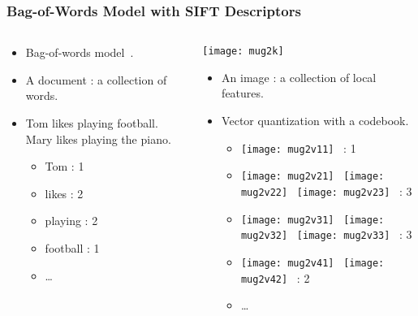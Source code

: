 \documentclass{beamer}
\begin{document}
\begin{frame}
  \frametitle{Bag-of-Words Model with SIFT Descriptors}

  \begin{columns}
    \begin{column}{.46\textwidth}
      \begin{itemize}
        \item Bag-of-words model~\cite{csurka_visual_2004}. 
      \end{itemize}

      \begin{itemize}
        \item A document : a collection of words.
        \item Tom likes playing football. Mary likes playing the piano.
          \begin{itemize}
            \item Tom : 1
            \item likes : 2
            \item playing : 2
            \item football : 1
            \item \ldots
          \end{itemize}
      \end{itemize}
    \end{column}
    \begin{column}{.46\textwidth}
      \centering
      \texttt{[image: mug2k]}
      \begin{itemize}
        \item An image : a collection of local features.
        \item Vector quantization with a codebook.
          \begin{itemize}
            \item
              \texttt{[image: mug2v11]}~ : 1
            \item
              \texttt{[image: mug2v21]}~
              \texttt{[image: mug2v22]}~
              \texttt{[image: mug2v23]}~ : 3
            \item
              \texttt{[image: mug2v31]}~
              \texttt{[image: mug2v32]}~
              \texttt{[image: mug2v33]}~ : 3
            \item
              \texttt{[image: mug2v41]}~
              \texttt{[image: mug2v42]}~ : 2
            \item \ldots
          \end{itemize}
      \end{itemize}
    \end{column}
  \end{columns}
\end{frame}
\end{document}
